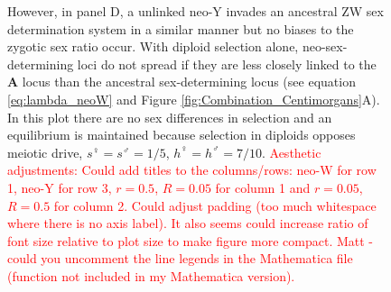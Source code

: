 \documentclass[12pt]{article}
\begin{document}
\begin{figure}[!h]
{However, in panel D, a unlinked neo-Y invades an ancestral ZW sex determination system in a similar manner but no biases to the zygotic sex ratio occur. 
With diploid selection alone, neo-sex-determining loci do not spread if they are less closely linked to the \textbf{A} locus than the ancestral sex-determining locus (see equation \eqref{eq:lambda_neoW} and Figure \ref{fig:Combination_Centimorgans}A). 
In this plot there are no sex differences in selection and an equilibrium is maintained because selection in diploids opposes meiotic drive, $s^\female =s^\male = 1/5$, $h^\female = h^\male = 7/10$.
\textcolor{red}{Aesthetic adjustments: Could add titles to the columns/rows: neo-W for row 1, neo-Y for row 3, $r=0.5$, $R=0.05$ for column 1 and $r=0.05$, $R=0.5$ for column 2. Could adjust padding (too much whitespace where there is no axis label). It also seems could increase ratio of font size relative to plot size to make figure more compact. Matt - could you uncomment the line legends in the Mathematica file (function not included in my Mathematica version).}
}
\label{fig:Combination_Turnover}
\end{figure}
\newpage
\end{document}
